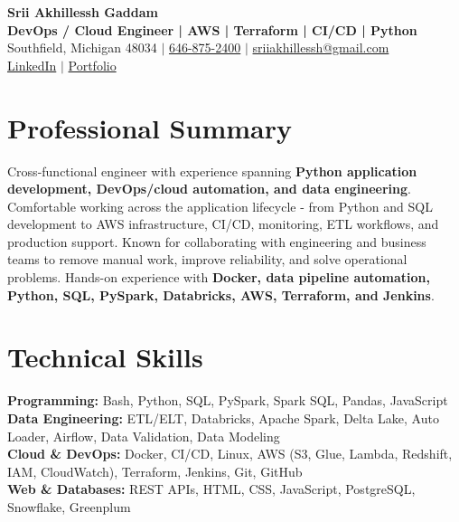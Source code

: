 \documentclass[letterpaper,10pt]{article}
\begin{document}
\fontsize{9.35pt}{10.45pt}\selectfont

\begin{center}
    {\LARGE \textbf{Srii Akhillessh Gaddam}} \\[-1pt]
    \textbf{DevOps / Cloud Engineer | AWS | Terraform | CI/CD | Python} \\[2pt]
    Southfield, Michigan 48034 $|$
    \href{tel:6468752400}{646-875-2400} $|$
    \href{mailto:sriiakhillessh@gmail.com}{sriiakhillessh@gmail.com} \\[1pt]
    \href{https://www.linkedin.com/in/srii-akhiilessh-gaddam-b48668191/}{LinkedIn} $|$
    \href{https://sriiakhillesshg.github.io/portfolio/}{Portfolio}
\end{center}
\vspace{-8pt}

\section{Professional Summary}
\small{Cross-functional engineer with experience spanning \textbf{Python application development, DevOps/cloud automation, and data engineering}. Comfortable working across the application lifecycle - from Python and SQL development to AWS infrastructure, CI/CD, monitoring, ETL workflows, and production support. Known for collaborating with engineering and business teams to remove manual work, improve reliability, and solve operational problems. Hands-on experience with \textbf{Docker, data pipeline automation, Python, SQL, PySpark, Databricks, AWS, Terraform, and Jenkins}.}

\section{Technical Skills}
\small{
\textbf{Programming:} Bash, Python, SQL, PySpark, Spark SQL, Pandas, JavaScript \\
\textbf{Data Engineering:} ETL/ELT, Databricks, Apache Spark, Delta Lake, Auto Loader, Airflow, Data Validation, Data Modeling \\
\textbf{Cloud \& DevOps:} Docker, CI/CD, Linux, AWS (S3, Glue, Lambda, Redshift, IAM, CloudWatch), Terraform, Jenkins, Git, GitHub \\
\textbf{Web \& Databases:} REST APIs, HTML, CSS, JavaScript, PostgreSQL, Snowflake, Greenplum
}
\end{document}
